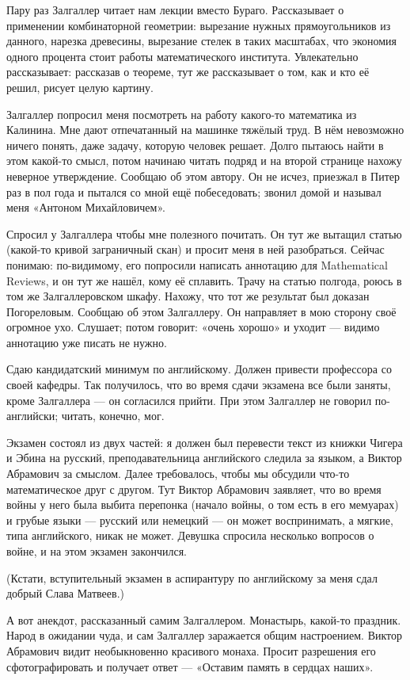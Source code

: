 \documentclass{book}
\begin{document}
Пару раз Залгаллер читает нам лекции вместо Бураго.
Рассказывает о применении комбинаторной геометрии:
вырезание нужных прямоугольников из данного,
нарезка древесины,
вырезание стелек в таких масштабах, 
что экономия одного процента стоит работы математического института.
Увлекательно рассказывает: 
рассказав о теореме, тут же рассказывает о том, как и кто её решил, 
рисует целую картину.

Залгаллер попросил меня посмотреть на работу какого-то математика из Калинина.
Мне дают отпечатанный на машинке тяжёлый труд.
В нём невозможно ничего понять, даже задачу, которую человек решает.
Долго пытаюсь найти в этом какой-то смысл,
потом начинаю читать подряд и на второй странице нахожу неверное утверждение.
Сообщаю об этом автору.
Он не исчез, приезжал в Питер раз в пол года и пытался со мной ещё побеседовать;
звонил домой и называл меня «Антоном Михайловичем».

Спросил у Залгаллера чтобы мне полезного почитать.
Он тут же вытащил статью (какой-то кривой заграничный скан) и просит меня в ней разобраться.
Сейчас понимаю: по-видимому, его попросили написать аннотацию для Mathematical Reviews, и он тут же нашёл, кому её сплавить.
Трачу на статью полгода, роюсь в том же Залгаллеровском шкафу.
Нахожу, что тот же результат был доказан Погореловым.
Сообщаю об этом Залгаллеру.
Он направляет в мою сторону своё огромное ухо. 
Слушает; потом говорит: «очень хорошо» и уходит --- видимо аннотацию уже писать не нужно.

Сдаю кандидатский минимум по английскому.
Должен привести профессора со своей кафедры.
Так получилось, что во время сдачи экзамена все были заняты, кроме Залгаллера --- он согласился прийти.
При этом Залгаллер не говорил по-английски;
читать, конечно, мог.

Экзамен состоял из двух частей: я должен был перевести текст из книжки Чигера и Эбина на русский,
преподавательница английского следила за языком, а Виктор Абрамович за смыслом.
Далее требовалось, чтобы мы обсудили что-то математическое друг с другом.
Тут Виктор Абрамович заявляет, что во время войны у него была выбита перепонка (начало войны, о том есть в его мемуарах) и грубые языки --- русский или немецкий --- он может воспринимать, а мягкие, типа английского, никак не может.
Девушка спросила несколько вопросов о войне, и на этом экзамен закончился.

(Кстати, вступительный экзамен в аспирантуру по английскому за меня сдал добрый Слава Матвеев.)

А вот анекдот, рассказанный самим Залгаллером.
Монастырь, какой-то праздник.
Народ в ожидании чуда, и сам Залгаллер заражается общим настроением.
Виктор Абрамович видит необыкновенно красивого монаха.
Просит разрешения его сфотографировать и получает ответ --- «Оставим память в сердцах наших».
\end{document}

